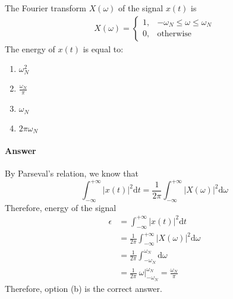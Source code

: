 \documentclass[12pt,a4paper]{article}
\begin{document}
\begin{q}{}
The Fourier transform $X(\omega)$ of the signal $x(t)$ is
\begin{align*}
    X(\omega) =
    \begin{cases}
    1, & -\omega_{N} \leq \omega \leq \omega_{N} \\
    0, & \text{otherwise}
    \end{cases}
\end{align*}
The energy of $x(t)$ is equal to:
\begin{enumerate}[label=(\alph*)]
    \item $\omega_{N}^{2}$
    \item $\frac{\omega_{N}}{\pi}$
    \item $\omega_{N}$
    \item $2\pi\omega_{N}$
\end{enumerate}

\paragraph{Answer}
By Parseval’s relation, we know that 
\[
    \int_{-\infty}^{+\infty} \lvert x(t) \rvert^2 \mathrm{d}t = 
    \frac{1}{2\pi} \int_{-\infty}^{+\infty} \lvert X(\omega) \rvert^2 \mathrm{d}\omega
\]
Therefore, energy of the signal
\begin{align*}
    \epsilon 
    & = \int_{-\infty}^{+\infty} \lvert x(t) \rvert^2 \mathrm{d}t \\
    & = \frac{1}{2\pi} \int_{-\infty}^{+\infty} \lvert X(\omega) \rvert^2 \mathrm{d}\omega \\
    & = \frac{1}{2\pi} \int_{-\omega_N}^{\omega_N} \mathrm{d}\omega \\
    & = \frac{1}{2\pi} \ \omega \bigg\lvert_{-\omega_N}^{\omega_N} = \frac{\omega_N}{\pi}
\end{align*}
Therefore, option (b) is the correct answer.
\end{q}
\end{document}
